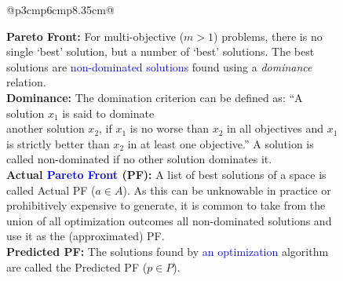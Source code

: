 \documentclass[sigconf,anonymous,review]{acmart}
\newcommand\llm[1]{\textcolor{blue}{#1\xspace}}
\begin{document}
\begin{figure}
{\begin{tabular}{@{}p{3cm}p{6cm}p{8.35cm}@{}}
{\begin{minipage}[b]{0.63\linewidth}
		        \textbf{Pareto Front: } For multi-objective ($m>1$) problems, there is no single `best' solution, but a number of `best' solutions. The best solutions are \llm{non-dominated solutions} found using a \textit{dominance} relation.\\
		        \textbf{Dominance: }The domination criterion  can be defined as: ``A solution $x_1$ is said to dominate\\
                another solution $x_2$, if $x_1$ is no worse than $x_2$ in all objectives
                and $x_1$ is strictly better than $x_2$ in at least one objective.'' A solution is called non-dominated if no other solution dominates it.\\
		        \textbf{Actual \llm{Pareto Front} (PF): } A list of best solutions of a space is called Actual PF ($a\in A$). As this can be unknowable in practice or prohibitively expensive to generate, it is common to take from the union of all optimization outcomes all non-dominated solutions and use it as the (approximated) PF.\\ %
		        \textbf{Predicted PF: } The solutions found by \llm{an optimization} algorithm are called the Predicted PF ($p\in P$).
		\end{minipage}
		
}
\end{tabular}}
\end{figure}
\end{document}
